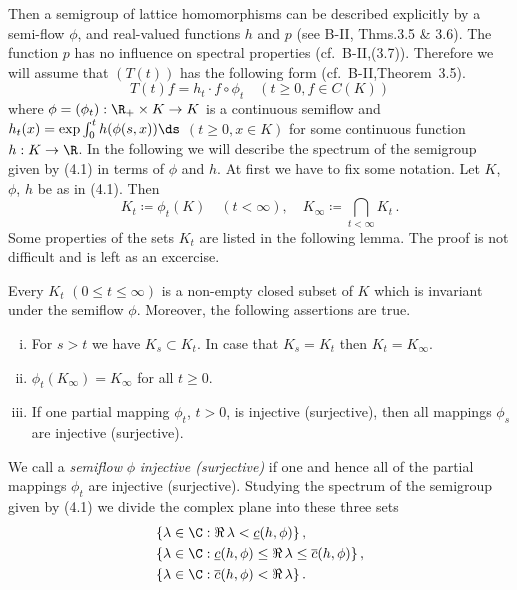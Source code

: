 Then a semigroup of lattice homomorphisms can be described explicitly by a semi-flow $\phi$, and real-valued functions $h$ and $p$ (see B-II, Thms.3.5 \& 3.6). The function $p$ has no influence on spectral proper­ties (cf.\ B-II,(3.7)). Therefore we will assume that $(T(t))$ has the following form (cf.\ B-II,Theorem~3.5). 
\begin{equation}\label{eq:b3-4.1}
	T(t)f = h_{t}\cdot f\circ\phi_{t} \quad (t \geq 0, f \in C(K)) 
\end{equation}
where $\phi = (\phi_{t}): \R_{+} \times K \to K$ is a continuous semiflow and $h_{t}(x) = \exp\int_{0}^{t} h(\phi(s,x)) \ds $ $(t \geq 0, x \in K)$ for some continuous function $h : K \to \R$.
%
%
In the following we will describe the spectrum of the semigroup given by (4.1) in terms of $\phi$ and $h$.
At first we have to fix some notation.
Let $K$, $\phi$, $h$ be as in (4.1). 
Then
\begin{equation}\label{eq:b3-4.2}
K_{t} \coloneq \phi_{t}(K) \quad (t < \infty), \quad K_{\infty} \coloneq \bigcap_{t < \infty} K_{t}\,.
\end{equation}
Some properties of the sets $K_t$  are listed in the following lemma.
The proof is not difficult and is left as an excercise. 
\begin{lemma}\label{lem:b3-4.2}
	Every $K_{t}$ $(0 \leq t \leq \infty)$ is a non-empty closed subset of $K$ which is invariant under the semiflow $\phi$.
	Moreover, the following assertions are true.
	\begin{enumerate}[(i)]
		\item 
		For $s > t$ we have $K_{s} \subset K_{t}$.
		In case that $K_{s} = K_{t}$ then $K_{t} = K_{\infty}$.
		
		\item
		$\phi_{t}(K_{\infty}) = K_{\infty}$ for all $t \geq 0$.
		
		\item 
		If one partial mapping $\phi_{t}$, $t > 0$, is injective (surjective), then all mappings $\phi_{s}$ are injective (surjective).
	\end{enumerate}
\end{lemma}
We call a \emph{semiflow} $\phi$ \emph{injective (surjective)} if one and hence all of the partial mappings $\phi_{t}$ are injective (surjective).
Studying the spectrum of the semigroup given by (4.1) we divide the complex plane into these three sets
\begin{equation}\label{eq:b3-4.3}
	\begin{aligned}
		&\{\lambda \in \C : \Re\,\lambda  < \underline{c}(h,\phi)\}\,, \\
		&\{\lambda \in \C : \underline{c}(h,\phi) \leq \Re\,\lambda  \leq \overline{c}(h,\phi)\}\,, \\
		&\{\lambda \in \C : \overline{c}(h,\phi) < \Re\,\lambda \}\,.
	\end{aligned}
\end{equation}
